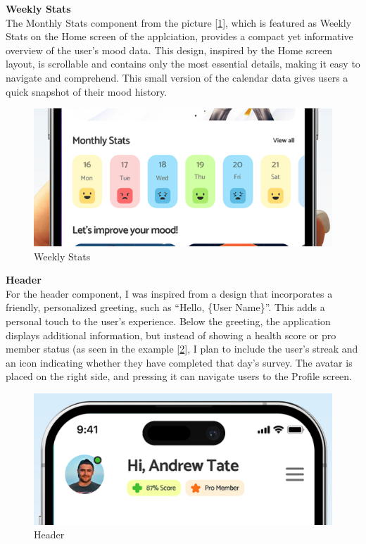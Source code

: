\vspace{5mm}

\noindent \textbf{Weekly Stats} \\
The Monthly Stats component from the picture [\ref{fig:weekly_stats}], which is featured as Weekly Stats on the Home screen of the applciation, provides a compact yet informative overview of the user’s mood data. This design, inspired by the Home screen layout, is scrollable and contains only the most essential details, making it easy to navigate and comprehend. This small version of the calendar data gives users a quick snapshot of their mood history.

\vspace{5mm}

\FloatBarrier
\begin{figure}[htbp]
    \centering
    \includegraphics[width=0.5\linewidth]{figures/inspiration/Weekly Stats.png}
    \caption{Weekly Stats}
    \label{fig:weekly_stats}
\end{figure}
\FloatBarrier

\vspace{5mm}

\noindent \textbf{Header} \\
For the header component, I was inspired from a design that incorporates a friendly, personalized greeting, such as ``Hello, \{User Name\}''. This adds a personal touch to the user’s experience. Below the greeting, the application displays additional information, but instead of showing a health score or pro member status (as seen in the example [\ref{fig:header}], I plan to include the user’s streak and an icon indicating whether they have completed that day's survey. The avatar is placed on the right side, and pressing it can navigate users to the Profile screen.

\vspace{5mm}

\FloatBarrier
\begin{figure}[htbp]
    \centering
    \includegraphics[width=0.45\linewidth]{figures/inspiration/Header.png}
    \caption{Header}
    \label{fig:header}
\end{figure}
\FloatBarrier

